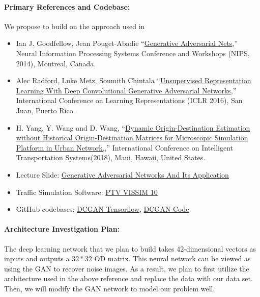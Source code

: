 \documentclass[11pt]{article}
\begin{document}
\paragraph{Primary References and Codebase:}  We propose to build on the approach used in 

\begin{itemize} 
\item Ian J. Goodfellow, Jean Pouget-Abadie ``\href{https://papers.nips.cc/paper/5423-generative-adversarial-nets.pdf}{Generative Adversarial Nets},'' Neural Information Processing Systems Conference and Workshops (NIPS, 2014), Montreal, Canada.  
\item Alec Radford, Luke Metz, Soumith Chintala ``\href{https://arxiv.org/pdf/1511.06434.pdf}{Unsupervised Representation Learning
With Deep Convolutional Generative Adversarial Networks},'' International Conference on Learning Representations (ICLR 2016), San Juan, Puerto Rico.  
\item H. Yang, Y. Wang and D. Wang, ``\href{https://www.researchgate.net/publication/329615627_Dynamic_Origin-Destination_Estimation_without_Historical_Origin-Destination_Matrices_for_Microscopic_Simulation_Platform_in_Urban_Network}{Dynamic Origin-Destination Estimation without Historical Origin-Destination Matrices for Microscopic Simulation Platform in Urban Network,},'' International Conference on Intelligent Transportation Systems(2018), Maui, Hawaii, United States.  
\item Lecture Slide: \href{https://d1b10bmlvqabco.cloudfront.net/attach/jqbjkm8k8bd3as/jl30qxr2rxn3ll/jsvc86ulb9yq/Guest_Lecture_by_Jiali_Duan.pdf}{Generative Adversarial Networks And Its Application}
\item Traffic Simulation Software: \href{http://vision-traffic.ptvgroup.com/en-us/products/ptv-vissim/}{PTV VISSIM 10}
\item GitHub codebases: \href{https://github.com/carpedm20/DCGAN-tensorflow} {DCGAN Tensorflow},  
\href{https://github.com/Newmu/dcgan_code}{DCGAN Code}
\end{itemize} 


\paragraph{Architecture Investigation Plan:}  The deep learning network that we plan to build takes 42-dimensional vectors as inputs and outputs a $32*32$ OD matrix. This neural network can be viewed as using the GAN to recover noise images. As a result, we plan to first utilize the architecture used in the above reference and replace the data with our data set. Then, we will modify the GAN network to model our problem well. 
\end{document}
